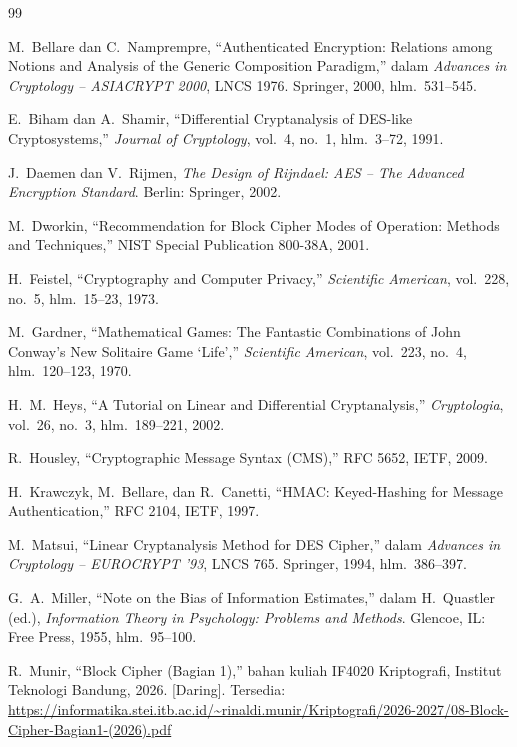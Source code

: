 \begin{thebibliography}{99}

M.~Bellare dan C.~Namprempre, ``Authenticated Encryption: Relations among Notions and Analysis of the Generic Composition Paradigm,'' dalam \textit{Advances in Cryptology -- ASIACRYPT 2000}, LNCS 1976. Springer, 2000, hlm.~531--545.

E.~Biham dan A.~Shamir, ``Differential Cryptanalysis of DES-like Cryptosystems,'' \textit{Journal of Cryptology}, vol.~4, no.~1, hlm.~3--72, 1991.

J.~Daemen dan V.~Rijmen, \textit{The Design of Rijndael: AES -- The Advanced Encryption Standard}. Berlin: Springer, 2002.

M.~Dworkin, ``Recommendation for Block Cipher Modes of Operation: Methods and Techniques,'' NIST Special Publication 800-38A, 2001.

H.~Feistel, ``Cryptography and Computer Privacy,'' \textit{Scientific American}, vol.~228, no.~5, hlm.~15--23, 1973.

M.~Gardner, ``Mathematical Games: The Fantastic Combinations of John Conway's New Solitaire Game `Life','' \textit{Scientific American}, vol.~223, no.~4, hlm.~120--123, 1970.

H.~M.~Heys, ``A Tutorial on Linear and Differential Cryptanalysis,'' \textit{Cryptologia}, vol.~26, no.~3, hlm.~189--221, 2002.

R.~Housley, ``Cryptographic Message Syntax (CMS),'' RFC 5652, IETF, 2009.

H.~Krawczyk, M.~Bellare, dan R.~Canetti, ``HMAC: Keyed-Hashing for Message Authentication,'' RFC 2104, IETF, 1997.

M.~Matsui, ``Linear Cryptanalysis Method for DES Cipher,'' dalam \textit{Advances in Cryptology -- EUROCRYPT '93}, LNCS 765. Springer, 1994, hlm.~386--397.

G.~A.~Miller, ``Note on the Bias of Information Estimates,'' dalam H.~Quastler (ed.), \textit{Information Theory in Psychology: Problems and Methods}. Glencoe, IL: Free Press, 1955, hlm.~95--100.

R.~Munir, ``Block Cipher (Bagian 1),'' bahan kuliah IF4020 Kriptografi, Institut Teknologi Bandung, 2026. [Daring]. Tersedia: \url{https://informatika.stei.itb.ac.id/~rinaldi.munir/Kriptografi/2026-2027/08-Block-Cipher-Bagian1-(2026).pdf}


\end{thebibliography}
